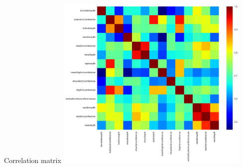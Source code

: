 \documentclass[10pt]{beamer}
\begin{document}
\begin{frame}{Correlation matrix}
	\centering
	\includegraphics[width=0.7\textwidth]{../Images/FCorr.png}
\end{frame}
\end{document}
